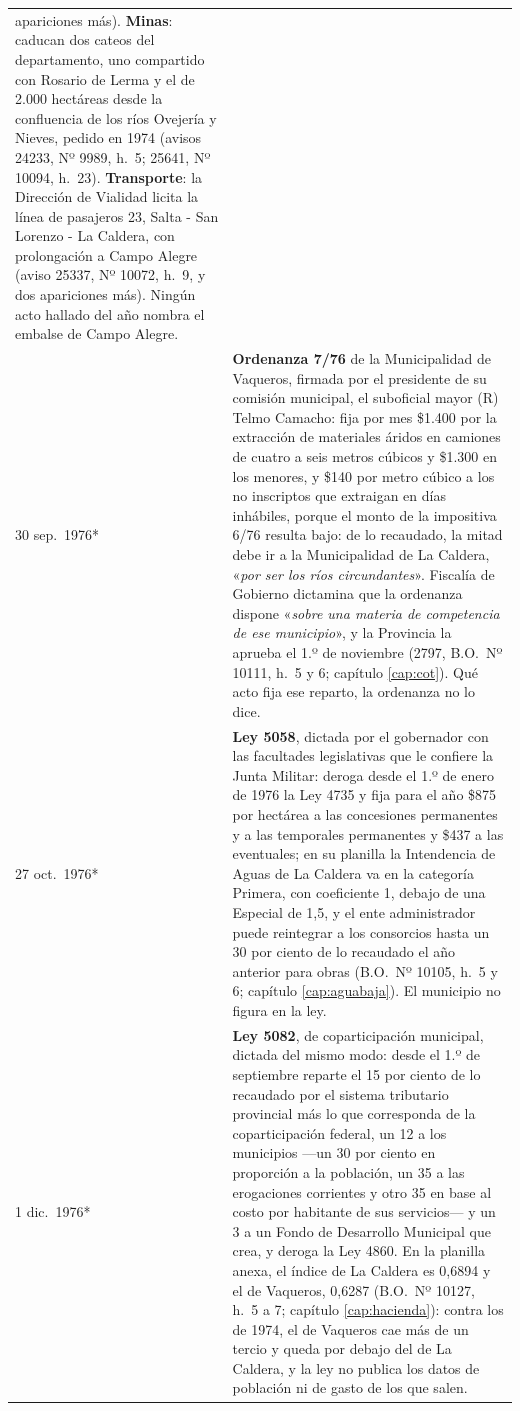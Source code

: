 \begin{longtable}{@{}p{2.7cm}p{10.3cm}@{}}
apariciones más). \textbf{Minas}: caducan dos cateos del departamento, uno compartido con Rosario de Lerma y el de 2.000 hectáreas desde la confluencia de los ríos Ovejería y Nieves, pedido en 1974 (avisos 24233, Nº 9989, h.\ 5; 25641, Nº 10094, h.\ 23). \textbf{Transporte}: la Dirección de Vialidad licita la línea de pasajeros 23, Salta - San Lorenzo - La Caldera, con prolongación a Campo Alegre (aviso 25337, Nº 10072, h.\ 9, y dos apariciones más). Ningún acto hallado del año nombra el embalse de Campo Alegre. \\
30 sep.\ 1976* & \textbf{Ordenanza 7/76} de la Municipalidad de Vaqueros, firmada por el presidente de su comisión municipal, el suboficial mayor (R) Telmo Camacho: fija por mes \$1.400 por la extracción de materiales áridos en camiones de cuatro a seis metros cúbicos y \$1.300 en los menores, y \$140 por metro cúbico a los no inscriptos que extraigan en días inhábiles, porque el monto de la impositiva 6/76 resulta bajo: de lo recaudado, la mitad debe ir a la Municipalidad de La Caldera, «\textit{por ser los ríos circundantes}». Fiscalía de Gobierno dictamina que la ordenanza dispone «\textit{sobre una materia de competencia de ese municipio}», y la Provincia la aprueba el 1.º de noviembre (2797, B.O.\ Nº 10111, h.\ 5 y 6; capítulo \ref{cap:cot}). Qué acto fija ese reparto, la ordenanza no lo dice. \\
27 oct.\ 1976* & \textbf{Ley 5058}, dictada por el gobernador con las facultades legislativas que le confiere la Junta Militar: deroga desde el 1.º de enero de 1976 la Ley 4735 y fija para el año \$875 por hectárea a las concesiones permanentes y a las temporales permanentes y \$437 a las eventuales; en su planilla la Intendencia de Aguas de La Caldera va en la categoría Primera, con coeficiente 1, debajo de una Especial de 1,5, y el ente administrador puede reintegrar a los consorcios hasta un 30 por ciento de lo recaudado el año anterior para obras (B.O.\ Nº 10105, h.\ 5 y 6; capítulo \ref{cap:aguabaja}). El municipio no figura en la ley. \\
1 dic.\ 1976* & \textbf{Ley 5082}, de coparticipación municipal, dictada del mismo modo: desde el 1.º de septiembre reparte el 15 por ciento de lo recaudado por el sistema tributario provincial más lo que corresponda de la coparticipación federal, un 12 a los municipios ---un 30 por ciento en proporción a la población, un 35 a las erogaciones corrientes y otro 35 en base al costo por habitante de sus servicios--- y un 3 a un Fondo de Desarrollo Municipal que crea, y deroga la Ley 4860. En la planilla anexa, el índice de La Caldera es 0,6894 y el de Vaqueros, 0,6287 (B.O.\ Nº 10127, h.\ 5 a 7; capítulo \ref{cap:hacienda}): contra los de 1974, el de Vaqueros cae más de un tercio y queda por debajo del de La Caldera, y la ley no publica los datos de población ni de gasto de los que salen. \\

\end{longtable}
